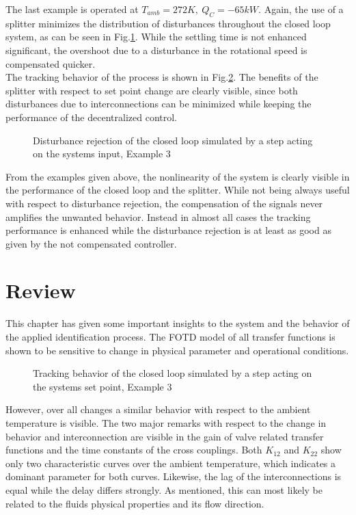 The last example is operated at $T_{amb} = 272 K,~Q_C = -65 kW$. Again, the use of a splitter minimizes the distribution of disturbances throughout the closed loop system, as can be seen in Fig.\ref{c:physical:f:disturbance3}. While the settling time is not enhanced significant, the overshoot due to a disturbance in the rotational speed is compensated quicker.\\

The tracking behavior of the process is shown in Fig.\ref{c:physical:f:tracking3}. The benefits of the splitter with respect to set point change are clearly visible, since both disturbances due to interconnections can be minimized while keeping the performance of the decentralized control.\\

\begin{figure}[H]

\caption{Disturbance rejection of the closed loop simulated by a step acting on the systems input, Example 3}
\label{c:physical:f:disturbance3}
\end{figure}


From the examples given above, the nonlinearity of the system is clearly visible in the performance of the closed loop and the splitter. While not being always useful with respect to disturbance rejection, the compensation of the signals never amplifies the unwanted behavior. Instead in almost all cases the tracking performance is enhanced while the disturbance rejection is at least as good as given by the not compensated controller.\\

\section{Review}\label{c:physical:s:review}

This chapter has given some important insights to the system and the behavior of the applied identification process. The FOTD model of all transfer functions is shown to be sensitive to change in physical parameter and operational conditions.

\begin{figure}[H]

\caption{Tracking behavior of the closed loop simulated by a step acting on the systems set point, Example 3}
\label{c:physical:f:tracking3}
\end{figure}

However, over all changes a similar behavior with respect to the ambient temperature is visible. The two major remarks with respect to the change in behavior and interconnection are visible in the gain of valve related transfer functions and the time constants of the cross couplings. Both $K_{12}$ and $K_{22}$ show only two characteristic curves over the ambient temperature, which indicates a dominant parameter for both curves. Likewise, the lag of the interconnections is equal while the delay differs strongly. As mentioned, this can most likely be related to the fluids physical properties and its flow direction.\\


